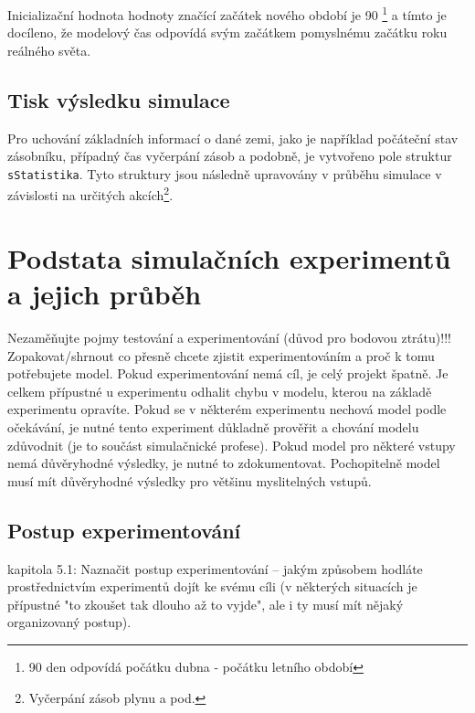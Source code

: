 \documentclass[a4paper,11pt]{article}
\begin{document}
Inicializační hodnota hodnoty značící začátek nového období je 90 \footnote{90 den odpovídá počátku dubna - počátku letního období}
a tímto je docíleno, že modelový čas odpovídá svým začátkem pomyslnému začátku roku reálného světa.

\subsection{Tisk výsledku simulace}

Pro uchování základních informací o dané zemi, jako je například počáteční stav zásobníku, případný čas vyčerpání zásob a podobně, je vytvořeno pole struktur \texttt{sStatistika}. Tyto struktury jsou následně upravovány v průběhu simulace v závislosti na určitých akcích\footnote{Vyčerpání zásob plynu a pod.}.

\section{Podstata simulačních experimentů a jejich průběh}

Nezaměňujte pojmy testování a experimentování (důvod pro bodovou ztrátu)!!!
Zopakovat/shrnout co přesně chcete zjistit experimentováním a proč k tomu potřebujete model. Pokud experimentování nemá cíl, je celý projekt špatně. Je celkem přípustné u experimentu odhalit chybu v modelu, kterou na základě experimentu opravíte. Pokud se v některém experimentu nechová model podle očekávání, je nutné tento experiment důkladně prověřit a chování modelu zdůvodnit (je to součást simulačnické profese). Pokud model pro některé vstupy nemá důvěryhodné výsledky, je nutné to zdokumentovat. Pochopitelně model musí mít důvěryhodné výsledky pro většinu myslitelných vstupů.
\subsection{Postup experimentování}

kapitola 5.1: Naznačit postup experimentování – jakým způsobem hodláte prostřednictvím experimentů dojít ke svému cíli (v některých situacích je přípustné "to zkoušet tak dlouho až to vyjde", ale i ty musí mít nějaký organizovaný postup).
\end{document}
